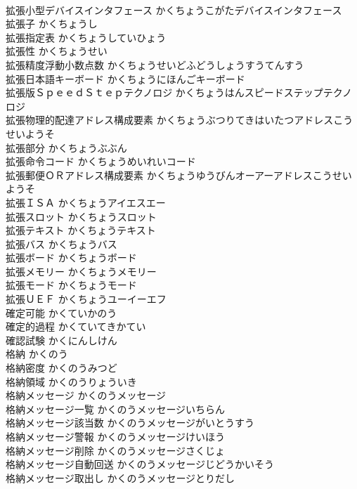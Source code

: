 \documentclass[8pt]{extreport}
\begin{document}
\begin{CJK}{UTF8}{min}
\\	拡張小型デバイスインタフェース	かくちょうこがたデバイスインタフェース	
\\	拡張子	かくちょうし	
\\	拡張指定表	かくちょうしていひょう	
\\	拡張性	かくちょうせい	
\\	拡張精度浮動小数点数	かくちょうせいどふどうしょうすうてんすう	
\\	拡張日本語キーボード	かくちょうにほんごキーボード	
\\	拡張版ＳｐｅｅｄＳｔｅｐテクノロジ	かくちょうはんスピードステップテクノロジ	
\\	拡張物理的配達アドレス構成要素	かくちょうぶつりてきはいたつアドレスこうせいようそ	
\\	拡張部分	かくちょうぶぶん	
\\	拡張命令コード	かくちょうめいれいコード	
\\	拡張郵便ＯＲアドレス構成要素	かくちょうゆうびんオーアーアドレスこうせいようそ	
\\	拡張ＩＳＡ	かくちょうアイエスエー	
\\	拡張スロット	かくちょうスロット	
\\	拡張テキスト	かくちょうテキスト	
\\	拡張バス	かくちょうバス	
\\	拡張ボード	かくちょうボード	
\\	拡張メモリー	かくちょうメモリー	
\\	拡張モード	かくちょうモード	
\\	拡張ＵＥＦ	かくちょうユーイーエフ	
\\	確定可能	かくていかのう	
\\	確定的過程	かくていてきかてい	
\\	確認試験	かくにんしけん	
\\	格納	かくのう	
\\	格納密度	かくのうみつど	
\\	格納領域	かくのうりょういき	
\\	格納メッセージ	かくのうメッセージ	
\\	格納メッセージ一覧	かくのうメッセージいちらん	
\\	格納メッセージ該当数	かくのうメッセージがいとうすう	
\\	格納メッセージ警報	かくのうメッセージけいほう	
\\	格納メッセージ削除	かくのうメッセージさくじょ	
\\	格納メッセージ自動回送	かくのうメッセージじどうかいそう	
\\	格納メッセージ取出し	かくのうメッセージとりだし	

\end{CJK}
\end{document}
